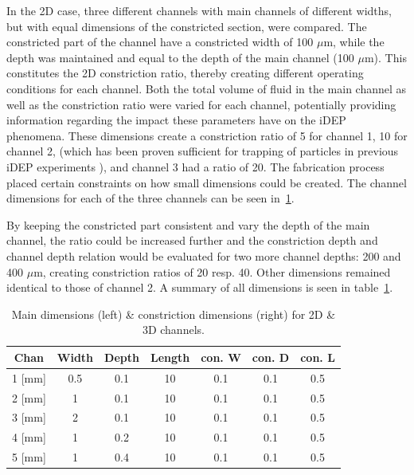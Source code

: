 \documentclass[journal, a4paper]{IEEEtran}
\begin{document}
In the 2D case, three different channels with main channels of different widths, but with equal dimensions of the constricted section, were compared. The constricted part of the channel have a constricted width of 100 $\mu$m, while the depth was maintained and equal to the depth of the main channel (100 $\mu$m). This constitutes the 2D constriction ratio, thereby creating different operating conditions for each channel. Both the total volume of fluid in the main channel as well as the constriction ratio were varied for each channel, potentially providing information regarding the impact these parameters have on the iDEP phenomena. These dimensions create a constriction ratio of 5 for channel 1, 10 for channel 2, (which has been proven sufficient for trapping of particles in previous iDEP experiments \cite{Braff:12}), and channel 3 had a ratio of 20. The fabrication process placed certain constraints on how small dimensions could be created. The channel dimensions for each of the three channels can be seen in~\ref{tab:dim}.

By keeping the constricted part consistent and vary the depth of the main channel, the ratio could be increased further and the constriction depth and channel depth relation would be evaluated for two more channel depths: 200 and 400 $\mu$m, creating constriction ratios of 20 resp. 40. Other dimensions remained identical to those of channel 2. A summary of all dimensions is seen in table~\ref{tab:dim}.

\begin{table}[!hbt]
\centering
\caption{Main dimensions (left) \& constriction dimensions (right) for 2D \& 3D channels.}
\label{tab:dim}
\begin{tabular}{c|ccc|ccc}
\textbf{Chan}  & \textbf{Width} & \textbf{Depth} & \textbf{Length} & \textbf{con. W} & \textbf{con. D} & \textbf{con. L} \\ \hline
1 [mm]& 0.5              & 0.1            & 10              & 0.1            & 0.1            & 0.5             \\
2 [mm]& 1            & 0.1            & 10              & 0.1            & 0.1            & 0.5             \\
3 [mm]& 2              & 0.1            & 10              & 0.1            & 0.1            & 0.5  \\ \hline
4 [mm]& 1            & 0.2            & 10              & 0.1            & 0.1            & 0.5             \\   
5 [mm]& 1            & 0.4            & 10              & 0.1            & 0.1            & 0.5            
\end{tabular}
\end{table}
\end{document}

